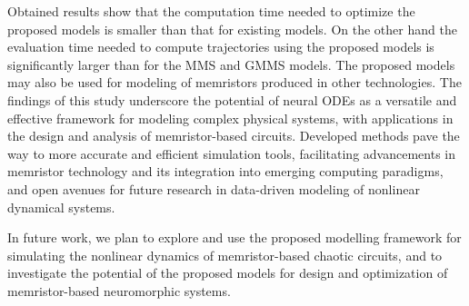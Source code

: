 \documentclass[a4,journal]{IEEEtran}
\begin{document}
Obtained results show that the computation time needed to optimize the proposed models is smaller than that for existing models. On the other hand the evaluation time needed to compute trajectories using the proposed models is significantly larger than for the MMS and GMMS models.
The proposed models may also be used for modeling of memristors produced in other technologies.  
The findings of this study underscore the potential of neural ODEs as a versatile and effective framework for modeling complex physical systems, with applications in the design and analysis of memristor-based circuits.
Developed methods pave the way to more accurate and efficient simulation tools, facilitating advancements in memristor technology and its integration into emerging computing paradigms, and open avenues for future research in data-driven modeling of nonlinear dynamical systems.

In future work, we plan to explore and use the proposed modelling framework for simulating the nonlinear dynamics of memristor-based chaotic circuits, and to investigate the potential of the proposed models for design and optimization of memristor-based neuromorphic systems.








\end{document}
